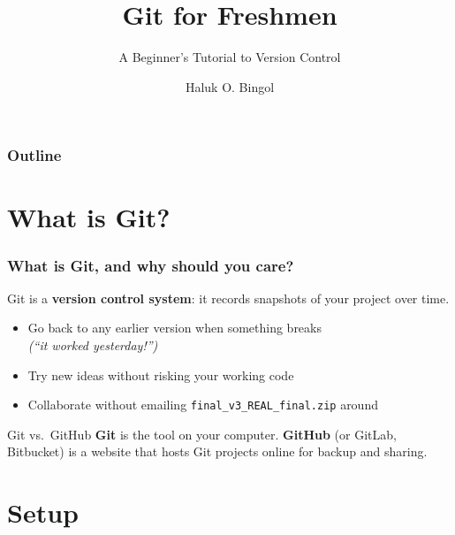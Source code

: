 \documentclass[aspectratio=169,10pt,compress]{beamer}
\title{Git for Freshmen}
\subtitle{A Beginner's Tutorial to Version Control}
\author[Bingol]{Haluk O. Bingol}
\institute[FCIS]{
    Faculty of Computer and Information Sciences\\
    Yeditepe University
}
\date{}
\begin{document}
\begin{frame}[t,fragile]
  \titlepage
\end{frame}

\begin{frame}[t,fragile] \frametitle{Outline}
  \tableofcontents
\end{frame}

\section[Intro]{What is Git?}

\begin{frame}[t,fragile] \frametitle{What is Git, and why should you care?}
  Git is a \textbf{version control system}: it records snapshots of your project over time.

  \vspace{0.5em}
  \begin{itemize}
    \item Go back to any earlier version when something breaks
          \\ \textit{(``it worked yesterday!'')}
    \item Try new ideas without risking your working code
    \item Collaborate without emailing \texttt{final\_v3\_REAL\_final.zip} around
  \end{itemize}

  \vspace{0.5em}
  \begin{block}{Git vs.\ GitHub}
    \textbf{Git} is the tool on your computer.
    \textbf{GitHub} (or GitLab, Bitbucket) is a website that hosts Git projects online
    for backup and sharing.
  \end{block}
\end{frame}

\section[Setup]{Setup}
\end{document}
